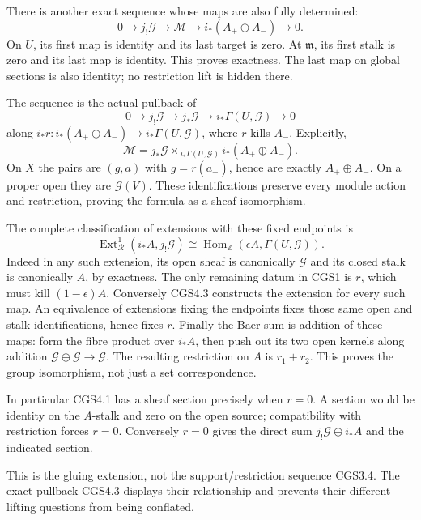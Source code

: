 There is another exact sequence whose maps are also fully determined: \[
 0\longrightarrow j_!\mathcal G
 \longrightarrow\mathcal M
 \longrightarrow i_*(A_+\oplus A_-)
 \longrightarrow0.
\tag{CGS4.1}
\] On \(U\), its first map is identity and its last target is zero. At
\(\mathfrak m\), its first stalk is zero and its last map is identity.
This proves exactness. The last map on global sections is also identity;
no restriction lift is hidden there.

The sequence is the actual pullback of \[
 0\to j_!\mathcal G\to j_*\mathcal G
 \to i_*\Gamma(U,\mathcal G)\to0
\tag{CGS4.2}
\] along \(i_*r:i_*(A_+\oplus A_-)\to i_*\Gamma(U,\mathcal G)\), where
\(r\) kills \(A_-\). Explicitly, \[
 \mathcal M=
 j_*\mathcal G\times_{\,i_*\Gamma(U,\mathcal G)}
 i_*(A_+\oplus A_-).
\tag{CGS4.3}
\] On \(X\) the pairs are \((g,a)\) with \(g=r(a_+)\), hence are exactly
\(A_+\oplus A_-\). On a proper open they are \(\mathcal G(V)\). These
identifications preserve every module action and restriction, proving
the formula as a sheaf isomorphism.

The complete classification of extensions with these fixed endpoints is
\[
 \boxed{
 \operatorname{Ext}_{\mathcal R}^{1}(i_*A,j_!\mathcal G)
 \cong\operatorname{Hom}_{\mathbb Z}(\epsilon A,\Gamma(U,\mathcal G)).
 }
\tag{CGS4.4}
\] Indeed in any such extension, its open sheaf is canonically
\(\mathcal G\) and its closed stalk is canonically \(A\), by exactness.
The only remaining datum in CGS1 is \(r\), which must kill
\((1-\epsilon)A\). Conversely CGS4.3 constructs the extension for every
such map. An equivalence of extensions fixing the endpoints fixes those
same open and stalk identifications, hence fixes \(r\). Finally the Baer
sum is addition of these maps: form the fibre product over \(i_*A\),
then push out its two open kernels along addition
\(\mathcal G\oplus\mathcal G\to\mathcal G\). The resulting restriction
on \(A\) is \(r_1+r_2\). This proves the group isomorphism, not just a
set correspondence.

In particular CGS4.1 has a sheaf section precisely when \(r=0\). A
section would be identity on the \(A\)-stalk and zero on the open
source; compatibility with restriction forces \(r=0\). Conversely
\(r=0\) gives the direct sum \(j_!\mathcal G\oplus i_*A\) and the
indicated section.

This is the gluing extension, not the support/restriction sequence
CGS3.4. The exact pullback CGS4.3 displays their relationship and
prevents their different lifting questions from being conflated.

